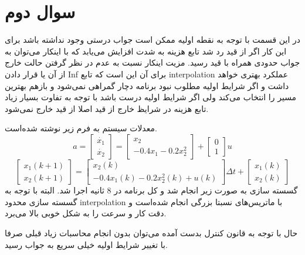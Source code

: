 \documentclass[12 pt]{article}
\begin{document}
\section*{سوال دوم}
در این قسمت با توجه به نقطه اولیه ممکن است جواب درستی وجود نداشته باشد برای این کار اگر از قید رد شد تابع هزینه به شدت افزایش می‌یابد که با اینکار می‌توان به جواب حدودی همراه با قید رسید. مزیت اینکار نسبت به عدم در نظر گرفتن حالت خارج از آن یا قرار دادن Inf برای آن این است که تابع interpolation عملکرد بهتری خواهد داشت و اگر شرایط اولیه مطلوب نبود برنامه دچار گمراهی نمی‌شود و بازهم بهترین  مسیر را انتخاب می‌کند ولی اگر شرایط اولیه درست باشد با توجه به تفاوت بسیار زیاد تابع هزینه‌ در شرایظ خارج از قید اصلا از قید خارج نمی‌شود.

معدلات سیستم به فرم زیر نوشته شده‌است.
$$
a = \begin{bmatrix}
	\dot{x_1}\\
	\dot{x_2}
\end{bmatrix} = \begin{bmatrix}
	x_2\\
	-0.4x_1 -0.2x_2^2
\end{bmatrix} + \begin{bmatrix}
	0\\
	1
\end{bmatrix}u
$$
$$
\begin{bmatrix}
	x_1(k+1)\\
	x_2(k+1)
\end{bmatrix} = \begin{bmatrix}
	x_2(k)\\
	-0.4x_1(k) -0.2x_2^2(k) + u(k)
\end{bmatrix} \Delta t + \begin{bmatrix}
x_1(k)\\
x_2(k)
\end{bmatrix}
$$
گسسته سازی به صورت زیر انجام شد و کل برنامه در 8 ثانیه اجرا شد. البته با توجه به گسسته سازی محدود interpolation با 
ماتریس‌های نسبتا بزرگی انجام شده‌است و دقت کار و سرعت را به شکل خوبی بالا می‌برد.

حال با توجه به قانون کنترل بدست آمده می‌توان بدون انجام محاسبات زیاد قبلی صرفا با تغییر شرایط اولیه خیلی سریع به جواب رسید.
\end{document}
